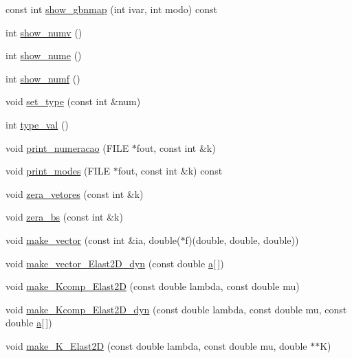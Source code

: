 \begin{DoxyCompactItemize}
\item 
const int \hyperlink{classPhElem_a878851914f553298700437c5c8aef4dd}{show\+\_\+gbnmap} (int ivar, int modo) const
\item 
int \hyperlink{classPhElem_a69a5cfc5b3b7faa4ad5f584311406ce1}{show\+\_\+numv} ()
\item 
int \hyperlink{classPhElem_aca4ef303cd316714d116062e8f4d8ca5}{show\+\_\+nume} ()
\item 
int \hyperlink{classPhElem_afbe63a88e47733c8daec89a4c72b7da0}{show\+\_\+numf} ()
\item 
void \hyperlink{classPhElem_ae226a41912e8e7c76be365518b2a38e2}{set\+\_\+type} (const int \&num)
\item 
int \hyperlink{classPhElem_a4ea6c54e35eb46d331db770f992c4c4b}{type\+\_\+val} ()
\item 
void \hyperlink{classPhElem_a8d2c46990cba5a5459198d883b763eab}{print\+\_\+numeracao} (F\+I\+LE $\ast$fout, const int \&k)
\item 
void \hyperlink{classPhElem_ae7659320b2118608e38d192443bb2b8f}{print\+\_\+modes} (F\+I\+LE $\ast$fout, const int \&k) const
\item 
void \hyperlink{classPhElem_a46f2be4d83b5c7c2cc9c6699f1fe977c}{zera\+\_\+vetores} (const int \&k)
\item 
void \hyperlink{classPhElem_a55ef84501df0d4e8aec6d49846e21237}{zera\+\_\+bs} (const int \&k)
\item 
void \hyperlink{classPhElem_a5051606f1d1e914d52d3de8655195c9f}{make\+\_\+vector} (const int \&ia, double($\ast$f)(double, double, double))
\item 
void \hyperlink{classPhElem_ad5732b2fb83ab0d9a2de7678391f87c4}{make\+\_\+vector\+\_\+\+Elast2\+D\+\_\+dyn} (const double \hyperlink{DG__EI__Header_8h_a491bc358fce276972681cc0be8844bd7}{a}\mbox{[}$\,$\mbox{]})
\item 
void \hyperlink{classPhElem_a1223b3e50580a1a7959e5f3b665d0761}{make\+\_\+\+Kcomp\+\_\+\+Elast2D} (const double lambda, const double mu)
\item 
void \hyperlink{classPhElem_a1ce74128a48a212028f644a68ce8edc0}{make\+\_\+\+Kcomp\+\_\+\+Elast2\+D\+\_\+dyn} (const double lambda, const double mu, const double \hyperlink{DG__EI__Header_8h_a491bc358fce276972681cc0be8844bd7}{a}\mbox{[}$\,$\mbox{]})
\item 
void \hyperlink{classPhElem_ac59f1cbe0962524e3aa5eced9a4393f6}{make\+\_\+\+K\+\_\+\+Elast2D} (const double lambda, const double mu, double $\ast$$\ast$K)
\item 
$$
\end{DoxyCompactItemize}

